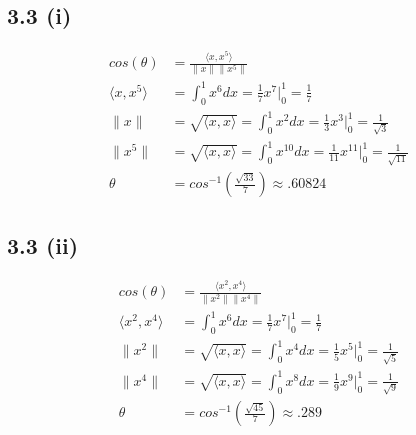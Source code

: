 \documentclass[letterpaper,12pt]{article}
\theoremstyle{definition}
\begin{document}
\subsection*{3.3 (i)}
\begin{align*}
cos(\theta)& = \frac{\langle x,x^{5}\rangle }{\|x\|\|x^{5}\|} \\
\langle x,x^{5}\rangle  &= \int^{1}_{0} x^{6} dx = \frac{1}{7}x^{7} |_{0}^{1} = \frac{1}{7} \\
\|x\| &= \sqrt{\langle x,x\rangle } = \int^{1}_{0} x^{2} dx = \frac{1}{3}x^{3} |_{0}^{1} = \frac{1}{\sqrt{3}} \\ 
\|x^{5}\| &= \sqrt{\langle x,x\rangle } = \int^{1}_{0} x^{10} dx = \frac{1}{11}x^{11} |_{0}^{1} = \frac{1}{\sqrt{11}} \\ 
\theta &= cos^{-1}(\frac{\sqrt{33}}{7}) \approx .60824
\end{align*}
\subsection*{3.3 (ii)}
\begin{align*}
cos(\theta)& = \frac{\langle x^{2},x^{4}\rangle }{\|x^{2}\|\|x^{4}\|} \\
\langle x^2,x^{4}\rangle  &= \int^{1}_{0} x^{6} dx = \frac{1}{7}x^{7} |_{0}^{1} = \frac{1}{7} \\
\|x^{2}\| &= \sqrt{\langle x,x\rangle } = \int^{1}_{0} x^{4} dx = \frac{1}{5}x^{5} |_{0}^{1} = \frac{1}{\sqrt{5}} \\ 
\|x^{4}\| &= \sqrt{\langle x,x\rangle } = \int^{1}_{0} x^{8} dx = \frac{1}{9}x^{9} |_{0}^{1} = \frac{1}{\sqrt{9}} \\ 
\theta &= cos^{-1}(\frac{\sqrt{45}}{7}) \approx .289
\end{align*}
\end{document}
